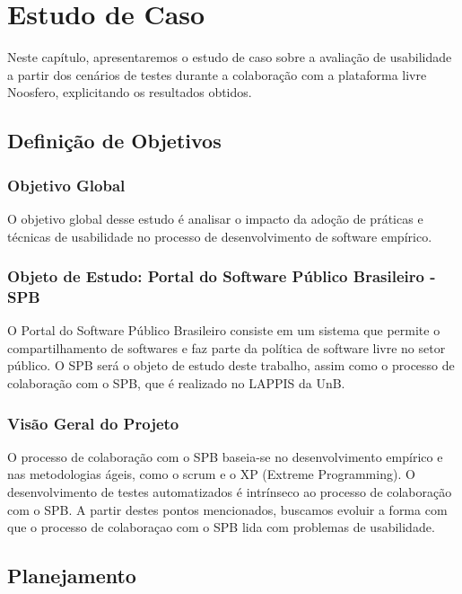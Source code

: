 \chapter{Estudo de Caso}

Neste capítulo, apresentaremos o estudo de caso sobre a avaliação de usabilidade a partir dos cenários de testes durante a colaboração com a plataforma livre Noosfero, explicitando os resultados obtidos.
%

\section{Definição de Objetivos}

\subsection{Objetivo Global}

O objetivo global desse estudo é analisar o impacto da adoção de práticas e técnicas de usabilidade no processo de desenvolvimento de software empírico.

\subsection{Objeto de Estudo: Portal do Software Público Brasileiro - SPB}

O Portal do Software Público Brasileiro consiste em um sistema que permite o compartilhamento de softwares e faz parte da política de software livre no setor público.
O SPB será o objeto de estudo deste trabalho, assim como o processo de colaboração com o SPB, que é realizado no LAPPIS da UnB.

\subsection{Visão Geral do Projeto}

O processo de colaboração com o SPB baseia-se no desenvolvimento empírico e nas metodologias ágeis, como o scrum e o XP (Extreme Programming). O desenvolvimento de testes automatizados é intrínseco ao processo de colaboração com o SPB. A partir destes pontos mencionados, buscamos evoluir a forma com que o processo de colaboraçao com o SPB lida com problemas de usabilidade.

\section{Planejamento}

